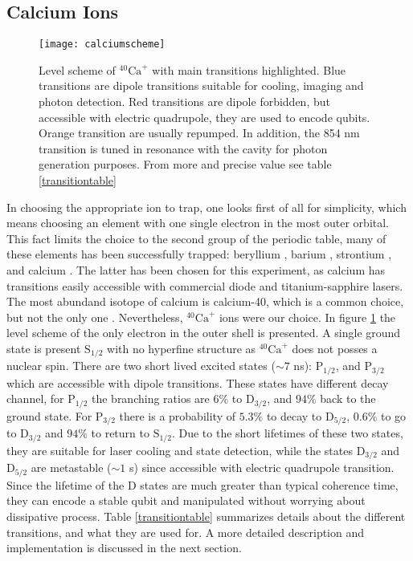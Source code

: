 \subsection{Calcium Ions}
\begin{figure}
\centering
\texttt{[image: calciumscheme]}
\caption{Level scheme of $^{40}\text{Ca}^+$ with main transitions highlighted. Blue transitions are dipole transitions suitable for cooling, imaging and photon detection. Red transitions are dipole forbidden, but accessible with electric quadrupole, they are used to encode qubits. Orange transition are usually repumped. In addition, the 854 nm transition is tuned in resonance with the cavity for photon generation purposes. From more and precise value see table \ref{transitiontable}}
\label{calciumscheme}
\end{figure}
In choosing the appropriate ion to trap, one looks first of all for simplicity, which means choosing an element with one single electron in the most outer orbital.
This fact limits the choice to the second group of the periodic table, many of these elements has been successfully trapped: beryllium \cite{beryllium}, barium \cite{barium}, strontium \cite{strontium}, and calcium \cite{calcium}.
The latter has been chosen for this experiment, as calcium has transitions easily accessible with commercial diode and titanium-sapphire lasers. The most abundand isotope of calcium is calcium-40, which is a common choice, but not the only one \cite{Tanaka2007}. Nevertheless, $^{40}\text{Ca}^+$ ions were our choice. In figure \ref{calciumscheme} the level scheme of the only electron in the outer shell is presented. A single ground state is present $\text{S}_{1/2}$ with no hyperfine structure as $^{40}\text{Ca}^+$ does not posses a nuclear spin. There are two short lived excited states ($\sim 7$ ns): $\text{P}_{1/2}$, and $\text{P}_{3/2}$ which are accessible with dipole transitions. These states have different decay channel, for $\text{P}_{1/2}$
the branching ratios are $6\%$ to $\text{D}_{3/2}$, and $94\%$ back to the ground state. For  $\text{P}_{3/2}$ there is a probability of $5.3\%$ to decay to   $\text{D}_{5/2}$, $0.6\%$ to go to  $\text{D}_{3/2}$ and $94\%$ to return to  $\text{S}_{1/2}$. Due to the short lifetimes of these two states, they are suitable for laser cooling and state detection, while the states $\text{D}_{3/2}$ and $\text{D}_{5/2}$
are metastable ($\sim 1$ s) since accessible with electric quadrupole transition. Since the lifetime of the D states are much greater than typical coherence time, they can encode a stable qubit and manipulated without worrying about dissipative process. Table \ref{transitiontable} summarizes details about the different transitions, and what they are used for. A more detailed description and implementation is discussed in the next section.


